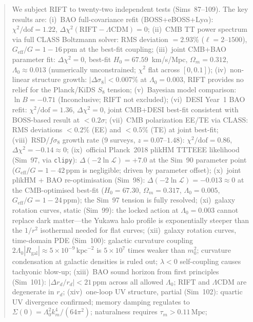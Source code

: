\documentclass[12pt,a4paper]{article}
\begin{document}
\begin{abstract}
We subject RIFT to twenty-two independent tests (Sims~87--109).
The key results are:
(i)~BAO full-covariance refit (BOSS+eBOSS+Ly$\alpha$):
    $\chi^2/\mathrm{dof}=1.22$, $\Delta\chi^2(\mathrm{RIFT}-\Lambda\mathrm{CDM})=0$;
(ii)~CMB TT power spectrum via full CLASS Boltzmann solver: RMS deviation $=2.93\%$
    ($\ell=2$--$1500$), $G_{\mathrm{eff}}/G = 1-16\,\mathrm{ppm}$ at the best-fit
    coupling;
(iii)~joint CMB+BAO parameter fit:
    $\Delta\chi^2=0$, best-fit $H_0=67.59$~km/s/Mpc, $\Omega_m=0.312$,
    $\Lambda_0\approx0.013$ (numerically unconstrained; $\chi^2$ flat across $[0,0.1]$);
(iv)~non-linear structure growth: $|\Delta\sigma_8|<0.007\%$ at $\Lambda_0=0.003$,
    RIFT provides no relief for the Planck/KiDS $S_8$ tension;
(v)~Bayesian model comparison: $\ln B = -0.71$ (Inconclusive; RIFT not excluded);
(vi)~DESI Year~1 BAO refit: $\chi^2/\mathrm{dof}=1.36$, $\Delta\chi^2=0$,
    joint CMB+DESI best-fit consistent with BOSS-based result at $<0.2\sigma$;
(vii)~CMB polarization EE/TE via CLASS: RMS deviations $<0.2\%$ (EE) and
    $<0.5\%$ (TE) at joint best-fit;
(viii)~RSD/$f\sigma_8$ growth rate (9 surveys, $z=0.07$--$1.48$):
    $\chi^2/\mathrm{dof}=0.86$, $\Delta\chi^2=-0.14\approx0$;
(ix)~official Planck~2018 plikHM TTTEEE likelihood (Sim~97, via \texttt{clipy}):
    $\Delta(-2\ln\mathcal{L})=+7.0$ at the Sim~90 parameter point
    ($G_\mathrm{eff}/G=1-42\,\mathrm{ppm}$ is negligible; driven by parameter offset);
(x)~joint plikHM + BAO re-optimisation (Sim~98): $\Delta(-2\ln\mathcal{L})=-0.013\approx 0$
    at the CMB-optimised best-fit ($H_0=67.30$, $\Omega_m=0.317$, $\Lambda_0=0.005$,
    $G_\mathrm{eff}/G=1-24\,\mathrm{ppm}$); the Sim~97 tension is fully resolved;
(xi)~galaxy rotation curves, static (Sim~99): the locked action at $\Lambda_0=0.003$
    cannot replace dark matter---the Yukawa halo profile is exponentially steeper
    than the $1/r^2$ isothermal needed for flat curves;
(xii)~galaxy rotation curves, time-domain PDE (Sim~100): galactic curvature coupling
    $2\Lambda_0|R_\mathrm{gal}|\approx5\times10^{-9}\,\mathrm{kpc}^{-2}$ is
    $5\times10^7$ times weaker than $m_0^2$; curvature condensation at galactic
    densities is ruled out; $\lambda<0$ self-coupling causes tachyonic blow-up;
(xiii)~BAO sound horizon from first principles (Sim~101): $|\Delta r_d/r_d|<21\,\mathrm{ppm}$
    across all allowed $\Lambda_0$; RIFT and $\Lambda$CDM are degenerate in $r_d$;
(xiv)~one-loop UV structure, partial (Sim~102): quartic UV divergence confirmed;
    memory damping regulates to $\Sigma(0)=\Lambda_0^2 k_m^4/(64\pi^2)$;
    naturalness requires $\tau_m>0.11\,\mathrm{Mpc}$;

\end{abstract}
\end{document}
